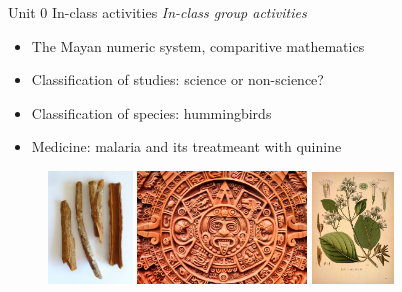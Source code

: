 \documentclass{beamer}
\begin{document}
\begin{frame}{Unit 0 In-class activities}
\small
\textit{In-class group activities}
\begin{itemize}
\small
\item The Mayan numeric system, comparitive mathematics
\item Classification of studies: science or non-science?
\item Classification of species: hummingbirds
\item Medicine: malaria and its treatmeant with quinine
\end{itemize}
\begin{figure}
\centering
\includegraphics[width=0.2\textwidth]{figures/cinchona.jpeg}
\includegraphics[width=0.4\textwidth]{figures/aztec.jpg}
\includegraphics[width=0.195\textwidth]{figures/cinchona2.jpeg}
\end{figure}
\end{frame}
\end{document}
